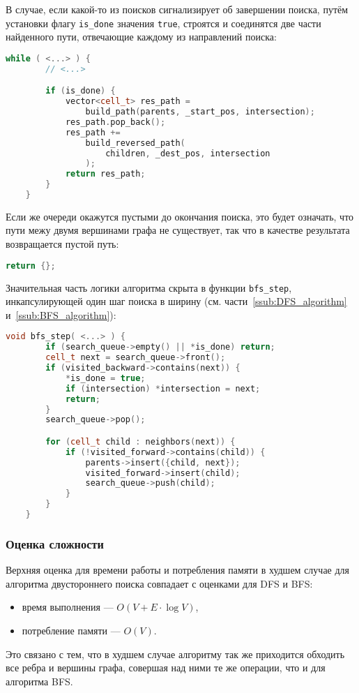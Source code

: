 \documentclass[a4paper, 12pt]{article}
\begin{document}
В случае, если какой-то из поисков сигнализирует об завершении поиска, путём установки флагу \verb|is_done| значения \verb|true|, строятся и соединятся две части найденного пути, отвечающие каждому из направлений поиска:
\begin{lstlisting}[language=C++]
    while ( <...> ) {
        // <...>

        if (is_done) {
            vector<cell_t> res_path =
                build_path(parents, _start_pos, intersection);
            res_path.pop_back();
            res_path +=
                build_reversed_path(
                    children, _dest_pos, intersection
                );
            return res_path;
        }
    }
\end{lstlisting}

Если же очереди окажутся пустыми до окончания поиска, это будет означать, что пути межу двумя вершинами графа не существует, так что в качестве результата возвращается пустой путь:
\begin{lstlisting}[language=C++]
    return {};
\end{lstlisting}

Значительная часть логики алгоритма скрыта в функции \verb|bfs_step|, инкапсулирующей один шаг поиска в ширину (см. части~\ref{ssub:DFS_algorithm} и~\ref{ssub:BFS_algorithm}):
\begin{lstlisting}[language=C++]
    void bfs_step( <...> ) {
        if (search_queue->empty() || *is_done) return;
        cell_t next = search_queue->front();
        if (visited_backward->contains(next)) {
            *is_done = true;
            if (intersection) *intersection = next;
            return;
        }
        search_queue->pop();

        for (cell_t child : neighbors(next)) {
            if (!visited_forward->contains(child)) {
                parents->insert({child, next});
                visited_forward->insert(child);
                search_queue->push(child);
            }
        }
    }
\end{lstlisting}

\subsubsection{Оценка сложности}
Верхняя оценка для времени работы и потребления памяти в худшем случае для алгоритма двустороннего поиска совпадает с оценками для DFS и BFS:
\begin{itemize}
    \item время выполнения --- \({ O(V + E \cdot \log V) }\),
    \item потребление памяти --- \({ O(V) }\).
\end{itemize}
Это связано с тем, что в худшем случае алгоритму так же приходится обходить все ребра и вершины графа, совершая над ними те же операции, что и для алгоритма BFS.
\end{document}
